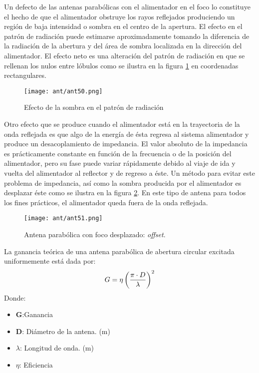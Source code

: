 \documentclass[
	12pt, %
	fleqn, %
	a4paper, %
	oneside, %
]{LegrandOrangeBook}
\begin{document}
Un defecto de las antenas parabólicas con el alimentador en el foco lo constituye el hecho de que el alimentador obstruye los rayos reflejados produciendo un región de baja intensidad o sombra en el centro de la apertura. El efecto en el patrón de radiación puede estimarse aproximadamente tomando la diferencia de la radiación de la abertura y del área de sombra localizada en la dirección del alimentador. El efecto neto es una alteración del patrón de radiación en que se rellenan los nulos entre lóbulos como se ilustra en la figura \ref{fig:sombra rad} en coordenadas rectangulares.
\begin{figure}[H]
\centering
\texttt{[image: ant/ant50.png]}
\caption{Efecto de la sombra en el patrón de radiación}
\label{fig:sombra rad}
\end{figure}
Otro efecto que se produce cuando el alimentador está en la trayectoria de la onda reflejada es que algo de la energía de ésta regresa al sistema alimentador y produce un desacoplamiento de impedancia. El valor absoluto de la impedancia es prácticamente constante en función de la frecuencia o de la posición del alimentador, pero su fase puede variar rápidamente debido al viaje de ida y vuelta del alimentador al reflector y de regreso a éste. Un método para evitar este problema de impedancia, así como la sombra producida por el alimentador es  desplazar éste como se ilustra en la figura \ref{fig:offset}. En este tipo de antena para todos los fines prácticos, el alimentador queda fuera de la onda reflejada.
\begin{figure}[H]
\centering
\texttt{[image: ant/ant51.png]}
\caption{Antena parabólica con foco desplazado: \textit{offset}.}
\label{fig:offset}
\end{figure}
\begin{definition}
La ganancia teórica de una antena parabólica de abertura circular excitada uniformemente está dada por:
\begin{equation}
G=\eta\left(\frac{\pi\cdot D}{\lambda}\right)^2
\label{eq:ganancia para}
\end{equation}
Donde:
\begin{itemize}
\item \textbf{G}:Ganancia
\item \textbf{D}: Diámetro de la antena. (m)
\item $\lambda$: Longitud de onda. (m)
\item $\eta$: Eficiencia
\end{itemize}
\end{definition}
\end{document}
